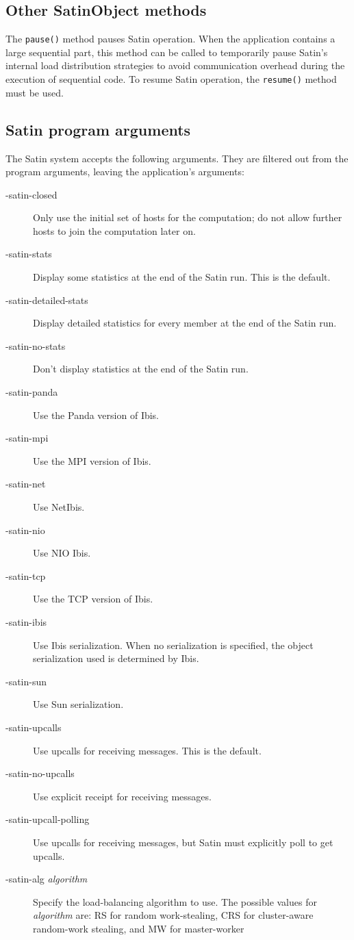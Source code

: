 \documentclass[10pt]{article}
\newcommand{\mysubsection}[1]{\subsection{#1}\label{#1}}
\begin{document}
\mysubsection{Other SatinObject methods}

The \verb+pause()+ method pauses Satin operation. When the application
contains a large sequential part, this method can be called to temporarily
pause Satin's internal load distribution strategies to avoid communication
overhead during the execution of sequential code.
To resume Satin operation, the \verb+resume()+ method must be used.

\mysubsection{Satin program arguments}

The Satin system accepts the following arguments. They are
filtered out from the program arguments, leaving the application's
arguments:
\begin{description}
\item[-satin-closed]
Only use the initial set of hosts for the computation; do not allow
further hosts to join the computation later on.
\item[-satin-stats]
Display some statistics at the end of the Satin run. This is the default.
\item[-satin-detailed-stats]
Display detailed statistics for every member at the end of the Satin run.
\item[-satin-no-stats]
Don't display statistics at the end of the Satin run.
\item[-satin-panda]
Use the Panda version of Ibis.
\item[-satin-mpi]
Use the MPI version of Ibis.
\item[-satin-net]
Use NetIbis.
\item[-satin-nio]
Use NIO Ibis.
\item[-satin-tcp]
Use the TCP version of Ibis.
\item[-satin-ibis]
Use Ibis serialization. When no serialization is specified,
the object serialization used is determined by Ibis.
\item[-satin-sun]
Use Sun serialization.
\item[-satin-upcalls]
Use upcalls for receiving messages. This is the default.
\item[-satin-no-upcalls]
Use explicit receipt for receiving messages.
\item[-satin-upcall-polling]
Use upcalls for receiving messages, but Satin must explicitly poll to get
upcalls.
\item[-satin-alg \emph{algorithm}]
Specify the load-balancing algorithm to use. The possible values for
\emph{algorithm} are: RS for random work-stealing, CRS for cluster-aware
random-work stealing, and MW for master-worker
\end{description}
\end{document}
